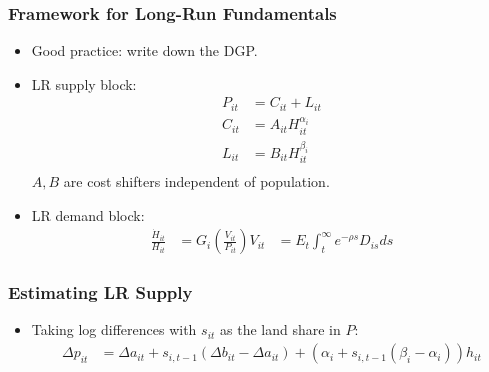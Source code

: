 \documentclass[english,xcolor=svgnames]{beamer}
\begin{document}
\begin{frame}
	\frametitle[alignment=center]{Framework for Long-Run Fundamentals}
	\begin{itemize}
		\item Good practice: write down the DGP.
		\item LR supply block:
		\begin{align*}
			P_{it} &= C_{it} + L_{it} \\
			C_{it} &= A_{it} H_{it}^{\alpha_i} \\
			L_{it} &= B_{it} H_{it}^{\beta_i} \\
		\end{align*}
		$A,B$ are cost shifters independent of population.
		\item LR demand block:
		\begin{align*}
			\frac{\dot{H}_{it}}{H_{it}} &= G_i \left(\frac{V_{it}}{P_{it}}\right)
			V_{it} &= E_t \int_t^\infty e^{-\rho s} D_{is}ds
		\end{align*}
	\end{itemize}
\end{frame}

\begin{frame}
	\frametitle[alignment=center]{Estimating LR Supply}
	\begin{itemize}
		\item Taking log differences with $s_{it}$ as the land share in $P$:
		\begin{align*}
			\Delta p_{it} &= \Delta a_{it} + s_{i,t-1} (\Delta b_{it} - \Delta a_{it}) + (\alpha_i + s_{i,t-1}(\beta_i - \alpha_i))h_{it}
		\end{align*}
	\end{itemize}
\end{frame}
\end{document}
